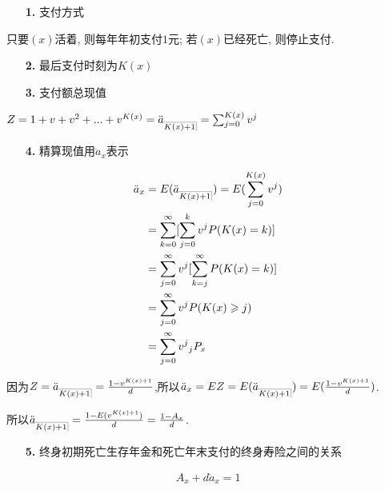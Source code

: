 \documentclass[a4paper,10pt]{ctexbook}
\makeatletter
\newcommand{\hei}{\CJKfamily{hei}}      %
\DeclareRobustCommand{\annu}[1]{_{%
    \def\arraystretch{0}%
    \setlength\arraycolsep{1pt}%
    \setlength\arrayrulewidth{.2pt}%
    \begin{array}[b]{@{}c|}\hline
        \\[\arraycolsep]%
        \scriptstyle #1%
    \end{array}%
}}
\makeatother
\begin{document}
\begin{itemize}
    \item[{\bf\hei 1.}]支付方式
\end{itemize}

只要$(x)$活着, 则每年年初支付$1$元; 若$(x)$已经死亡, 则停止支付.

\begin{itemize}
    \item[{\bf\hei 2.}]最后支付时刻为$K(x)$
\end{itemize}

\begin{itemize}
    \item[{\bf\hei 3.}]支付额总现值
\end{itemize}

$Z=1+v+v^2+...+v^{K(x)}=\ddot a_{\annu {K(x)+1}}=\sum_{j=0}^{K\left( x \right)}{v^j}$

\begin{itemize}
    \item[{\bf\hei 4.}]精算现值用$\ddot a_x$表示
\end{itemize}

\begin{align*}
    \ddot a_x & =E(\ddot a_{\annu {K(x)+1}})=E(\sum_{j=0}^{K\left( x \right)}{v^j}) \\
              & = \sum_{k=0}^{\infty}[\sum_{j=0}^{k}{v^j}P(K(x) = k)]               \\
              & = \sum_{j=0}^{\infty}v^j[\sum_{k=j}^{\infty}P(K(x) = k)]            \\
              & =\sum_{j=0}^{\infty}{v^j}P(K(x) \geqslant j)                        \\
              & =\sum_{j=0}^{\infty}{v^j}{}_j P_x                                   \\
\end{align*}

因为$Z=\ddot a_{\annu {K(x)+1}}=\frac{1-v^{K(x)+1}}{d}$,所以$\ddot a_x=EZ=E(\ddot a_{\annu {K(x)+1}})=E(\frac{1-v^{K(x)+1}}{d})$.

所以$\ddot a_{\annu {K(x)+1}}=\frac{1-E(v^{K(x)+1})}{d}=\frac{1-A_x}{d}$.

\begin{itemize}
    \item[{\bf\hei 5.}]终身初期死亡生存年金和死亡年末支付的终身寿险之间的关系
\end{itemize}

\begin{align*}
    A_x+d \ddot a_x=1
\end{align*}
\end{document}
